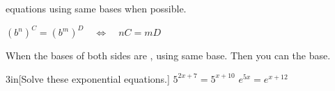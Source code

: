 \begin{tcbraster}[ 
    raster columns = 2,
    raster left skip = 0.25in, raster right skip = 0.25in,
    raster column skip = 0.125in,
    ]
    \begin{tcolorbox}
         equations using same bases when possible.
        \end{tcolorbox}
    \begin{tcolorbox}
        \centering
        $           
        \left(b^n\right)^C = \left(b^m\right)^D
        \quad\Leftrightarrow\quad nC = mD 
        $
    \end{tcolorbox}
\end{tcbraster}

When the bases of both sides are ,
 using same base.
Then you can  the base.

\begin{my2Problems}[\normalsize]{3in}[Solve these exponential equations.]
    {
        $5^{2x+7} = 5^{x+10}$
    }
    {
        $e^{5x} = e^{x+12}$
    }
\end{my2Problems}

